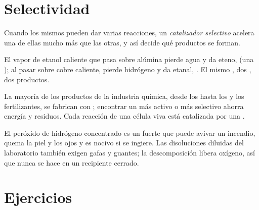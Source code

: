 \section{Selectividad}

\begin{definition}\label{def:g12:catalysis:selective}
Cuando los mismos  pueden dar varias reacciones, un
\emph{catalizador selectivo} acelera una de
ellas mucho más que las otras, y así decide qué productos se forman.
\end{definition}

\begin{example}\label{ex:g12:catalysis:ethanol}
El vapor de etanol caliente que pasa sobre alúmina pierde agua y da
eteno,  (una ); al pasar sobre cobre
caliente, pierde hidrógeno y da etanal, . El
mismo , dos , dos productos.
\end{example}

\begin{remark}\label{rem:g12:catalysis:everywhere}
La mayoría de los productos de la industria química, desde los
 hasta los  y los fertilizantes, se fabrican con
; encontrar un  más activo o más selectivo ahorra
energía y residuos. Cada reacción de una célula viva está catalizada por
una .
\end{remark}

\begin{safety}{}
El peróxido de hidrógeno concentrado es un  fuerte que puede
avivar un incendio, quema la piel y los ojos y es nocivo si se ingiere.
Las disoluciones diluidas del laboratorio también exigen gafas y
guantes; la descomposición libera oxígeno, así que nunca se hace en un
recipiente cerrado.
\end{safety}

\section{Ejercicios}


